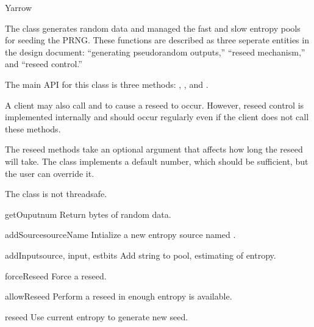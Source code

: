 \documentclass{howto}
\begin{document}
\begin{classdesc}{Yarrow}{}

The  class generates random data and managed the fast
and slow entropy pools for seeding the PRNG.  These functions are
described as three seperate entities in the design document:
``generating pseudorandom outputs,'' ``reseed mechanism,'' and
``reseed control.''

The main API for this class is three methods: , 
, and .

A client may also call  and 
to cause a reseed to occur.  However, reseed control is implemented
internally and should occur regularly even if the client does not call
these methods.

The reseed methods take an optional  argument that
affects how long the reseed will take.  The class implements a
default number, which should be sufficient, but the user can
override it.

The  class is not threadsafe.

\begin{methoddesc}{getOuput}{num}
Return  bytes of random data.
\end{methoddesc}

\begin{methoddesc}{addSource}{sourceName}
Intialize a new entropy source named .
\end{methoddesc}

\begin{methoddesc}{addInput}{source, input, estbits}
Add  string to  pool, estimating 
of entropy.
\end{methoddesc}

\begin{methoddesc}{forceReseed}{}
Force a reseed.
\end{methoddesc}

\begin{methoddesc}{allowReseed}{}
Perform a reseed in enough entropy is available.
\end{methoddesc}

\begin{methoddesc}{reseed}{}
Use current entropy to generate new seed.
\end{methoddesc}

\end{classdesc}
\end{document}
